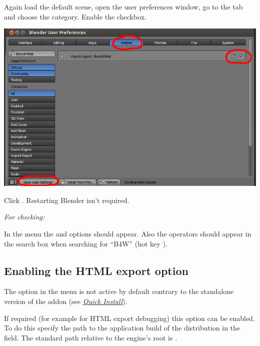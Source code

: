 \documentclass[a4paper,12pt,oneside]{sphinxmanual}
\begin{document}
Again load the default scene, open the user preferences window, go to the  tab and choose the  category. Enable the  checkbox.

{\hfill\includegraphics[width=1.000\linewidth]{user_preferences_enable_addon.jpg}\hfill}

\begin{DUlineblock}{0em}
\item[] 
\end{DUlineblock}

Click . Restarting Blender isn't required.

\emph{For checking:}

In the  menu the  and  options should appear. Also the operators should appear in the search box when searching for ``B4W'' (hot key ).


\subsection{Enabling the HTML export option}
\label{setup:html}
The  option in the  menu is not active by default contrary to the standalone version of the addon (see {\hyperref[first_steps:quick-install]{\emph{Quick Install}}}).

If required (for example for HTML export debugging) this option can be enabled. To do this specify the path to the  application build of the distribution in the  field. The standard path relative to the engine's root is .
\end{document}
